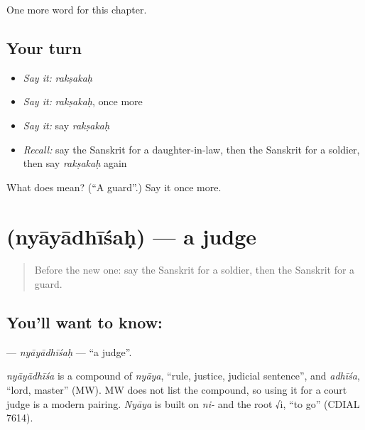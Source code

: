 \begin{grammarlens}[title={What you've built}]
One more word for this chapter.
\end{grammarlens}

\subsection*{Your turn}
\begin{itemize}
\raggedright
  \item \emph{Say it:} \emph{rakṣakaḥ}
  \item \emph{Say it:} \emph{rakṣakaḥ}, once more
  \item \emph{Say it:} say \emph{rakṣakaḥ}
  \item \emph{Recall:} say the Sanskrit for a daughter-in-law, then the Sanskrit for a soldier, then say \emph{rakṣakaḥ} again
\end{itemize}

\begin{tcolorbox}[breakable,colback=teal!4,colframe=teal!35!black,title={Before you move on}]
What does  mean? (\textquotedblleft{}A guard\textquotedblright{}.) Say it once more.
\end{tcolorbox}
\section[\texorpdfstring{\sk{न्यायाधीशः} (nyāyādhīśaḥ)}{न्यायाधीशः (nyāyādhīśaḥ)}]{ (nyāyādhīśaḥ) — a judge}

\label{lesson:SA-C179-nyayadhisah}



\begin{quote}
Before the new one: say the Sanskrit for a soldier, then the Sanskrit for a guard.
\end{quote}

\subsection*{You'll want to know: }
\textbf{} — \emph{nyāyādhīśaḥ} — \textquotedblleft{}a judge\textquotedblright{}.

\begin{cousinweb}
\emph{nyāyādhīśa} is a compound of \emph{nyāya}, \textquotedblleft{}rule, justice, judicial sentence\textquotedblright{}, and \emph{adhīśa}, \textquotedblleft{}lord, master\textquotedblright{} (MW). MW does not list the compound, so using it for a court judge is a modern pairing. \emph{Nyāya} is built on \emph{ni-} and the root √i, \textquotedblleft{}to go\textquotedblright{} (CDIAL 7614).
\end{cousinweb}

